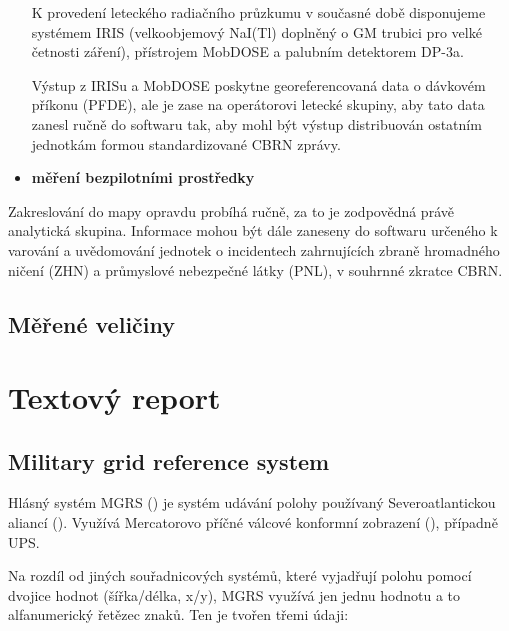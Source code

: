 \begin{itemize}
	K provedení leteckého radiačního průzkumu v současné době disponujeme systémem IRIS (velkoobjemový NaI(Tl) doplněný o GM trubici pro velké četnosti záření), přístrojem MobDOSE a palubním detektorem DP-3a.

	Výstup z IRISu a MobDOSE poskytne georeferencovaná data o dávkovém příkonu (PFDE), ale je zase na operátorovi letecké skupiny, aby tato data zanesl ručně do softwaru tak, aby mohl být výstup distribuován ostatním jednotkám formou standardizované CBRN zprávy.

	\item \textbf{měření bezpilotními prostředky}
\end{itemize}

	Zakreslování do mapy opravdu probíhá ručně, za to je zodpovědná právě analytická skupina. Informace mohou být dále zaneseny do softwaru určeného k varování a uvědomování jednotek o incidentech zahrnujících zbraně hromadného ničení (ZHN) a průmyslové nebezpečné látky (PNL), v souhrnné zkratce CBRN. 
	
\subsection{Měřené veličiny}




\section{Textový report}


\subsection{Military grid reference system}
Hlásný systém MGRS () je systém udávání polohy používaný Severoatlantickou aliancí (). Využívá Mercatorovo příčné válcové konformní zobrazení (), případně UPS. 

Na rozdíl od jiných souřadnicových systémů, které vyjadřují polohu pomocí dvojice hodnot (šířka/délka, x/y), MGRS využívá jen jednu hodnotu a to alfanumerický řetězec znaků. Ten je tvořen třemi údaji:

